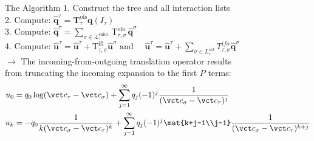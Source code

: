 \begin{frame}{The Algorithm}
  1. Construct the tree and all interaction lists\\
  \vspace{3mm}
  2. Compute: $\hat{\mathbf{q}}^{\tau}=\mathbf{T}_{\tau}^{\mathrm{ofs}} \mathbf{q}\left(I_{\tau}\right)$\\
  \vspace{3mm}
  3. Compute: $\hat{\mathbf{q}}^{\tau}=\sum_{\sigma \in \mathcal{L}_{\tau}^{\text {child }}} \mathrm{T}_{\tau, \sigma}^{\text {ofo }} \hat{\mathbf{q}}^{\sigma}$\\
  \vspace{3mm}
  4. Compute: $\hat{\mathbf{u}}^{\tau}=\hat{\mathbf{u}}^{\tau}+\mathrm{T}_{\tau, \sigma}^{\mathrm{ifi}} \hat{\mathbf{u}}^{\sigma} \text { and } \quad \hat{\boldsymbol{u}}^{\tau}=\hat{\boldsymbol{u}}^{\tau}+\sum_{\sigma \in L_{\tau}^{i n t}} T_{\tau, \sigma}^{i f o} \widehat{\boldsymbol{q}}^{\sigma}$\\
  \vspace{8mm}
  \setlength{\parindent}{4ex}  $\rightarrow$ The incoming-from-outgoing translation operator results\\ \setlength{\parindent}{4ex} from truncating the incoming expansion to the first $P$ terms:
    \begin{equation}
      \begin{split}
        u_0 &= q_0 \log(\vct c_\tau - \vct c_\sigma) + \sum_{j=1}^\infty q_j (-1)^j \frac 1 {(\vct c_\sigma - \vct c_\tau)^j} \\
        u_k &= -q_0 \frac 1 {k(\vct c_\sigma - \vct c_\tau)^k} + \sum_{j=1}^\infty q_j (-1)^j \mat{k+j-1\\j-1} \frac 1 {(\vct c_\sigma - \vct c_\tau)^{k+j}} \\
      \end{split}
    \end{equation}
\end{frame}


